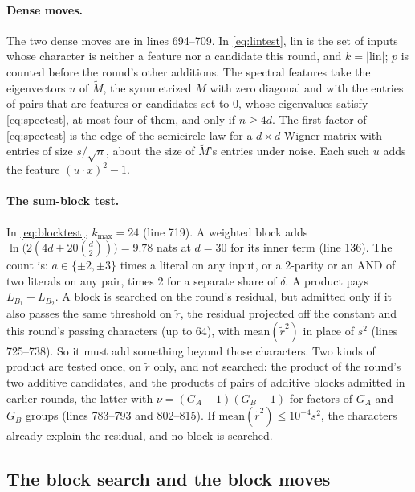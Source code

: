 \paragraph{Dense moves.} The two dense moves are in lines 694--709. In \cref{eq:lintest}, $\mathrm{lin}$ is the set of inputs whose character is neither a feature nor a candidate this round, and $k=|\mathrm{lin}|$; $p$ is counted before the round's other additions. The spectral features take the eigenvectors $u$ of $\tilde M$, the symmetrized $M$ with zero diagonal and with the entries of pairs that are features or candidates set to 0, whose eigenvalues satisfy \cref{eq:spectest}, at most four of them, and only if $n\ge4d$. The first factor of \cref{eq:spectest} is the edge of the semicircle law for a $d\times d$ Wigner matrix with entries of size $s/\sqrt n$, about the size of $\tilde M$'s entries under noise. Each such $u$ adds the feature $(u\cdot x)^2-1$.

\paragraph{The sum-block test.} In \cref{eq:blocktest}, $k_{\max}=24$ (line 719). A weighted block adds $\ln\bigl(2(4d+20\binom d2)\bigr)=9.78$ nats at $d=30$ for its inner term (line 136). The count is: $a\in\{\pm2,\pm3\}$ times a literal on any input, or a 2-parity or an AND of two literals on any pair, times 2 for a separate share of $\delta$. A product pays $L_{B_1}+L_{B_2}$. A block is searched on the round's residual, but admitted only if it also passes the same threshold on $\tilde r$, the residual projected off the constant and this round's passing characters (up to 64), with $\mathrm{mean}(\tilde r^2)$ in place of $s^2$ (lines 725--738). So it must add something beyond those characters. Two kinds of product are tested once, on $\tilde r$ only, and not searched: the product of the round's two additive candidates, and the products of pairs of additive blocks admitted in earlier rounds, the latter with $\nu=(G_A-1)(G_B-1)$ for factors of $G_A$ and $G_B$ groups (lines 783--793 and 802--815). If $\mathrm{mean}(\tilde r^2)\le10^{-4}s^2$, the characters already explain the residual, and no block is searched.

\subsection{The block search and the block moves}\label{app:learner-search}

